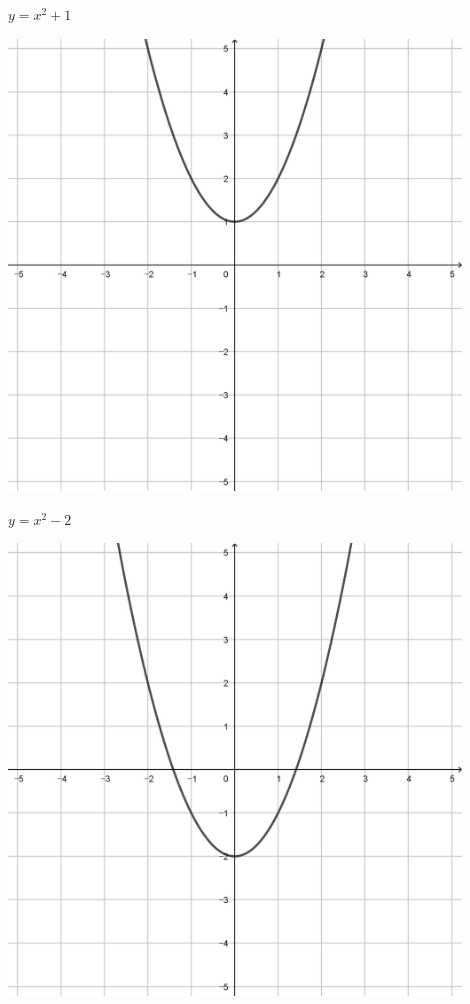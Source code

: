 \documentclass[a4paper]{oblivoir}
\begin{document}
\begin{minipage}{0.45\textwidth}\centering
\(y=x^2+1\)
\par\bigskip\includegraphics[width=0.9\textwidth]{img/2_quadratic_9}
\end{minipage}
\begin{minipage}{0.45\textwidth}\centering
\(y=x^2-2\)
\par\bigskip\includegraphics[width=0.9\textwidth]{img/2_quadratic_10}
\end{minipage}\bigskip\bigskip\par
\end{document}
